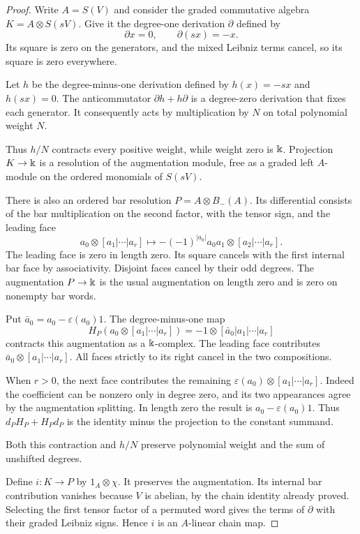 \begin{proof}
Write $A=S(V)$ and consider the graded commutative algebra
$K=A\otimes S(sV)$.
Give it the degree-one derivation $\partial$ defined by
\[
 \partial x=0,\qquad \partial(sx)=-x.
\]
Its square is zero on the generators, and the mixed Leibniz
terms cancel, so its square is zero everywhere.

Let $h$ be the degree-minus-one derivation defined by
$h(x)=-sx$ and $h(sx)=0$.
The anticommutator $\partial h+h\partial$ is a degree-zero
derivation that fixes each generator.
It consequently acts by multiplication by $N$ on total
polynomial weight $N$.

Thus $h/N$ contracts every positive weight, while weight zero
is $\Bbbk$.  Projection $K\to \Bbbk$ is a resolution of the augmentation
module, free as a graded left $A$-module on the ordered
monomials of $S(sV)$.

There is also an ordered bar resolution
$P=A\otimes B_-(A)$.
Its differential consists of the bar multiplication on the
second factor, with the tensor sign, and the leading face
\[
 a_0\otimes[a_1|\cdots|a_r]
 \longmapsto-(-1)^{|a_0|}a_0a_1\otimes[a_2|\cdots|a_r].
\]
The leading face is zero in length zero.
Its square cancels with the first internal bar face by
associativity.  Disjoint faces cancel by their odd degrees.
The augmentation $P\to \Bbbk$ is the usual augmentation on
length zero and is zero on nonempty bar words.

Put $\bar a_0=a_0-\varepsilon(a_0)1$.
The degree-minus-one map
\[
 H_P(a_0\otimes[a_1|\cdots|a_r])
 =-1\otimes[\bar a_0|a_1|\cdots|a_r]
\]
contracts this augmentation as a $\Bbbk$-complex.
The leading face contributes $\bar a_0\otimes[a_1|\cdots|a_r]$.
All faces strictly to its right cancel in the two compositions.

When $r>0$, the next face contributes the remaining
$\varepsilon(a_0)\otimes[a_1|\cdots|a_r]$.
Indeed the coefficient can be nonzero only in degree zero,
and its two appearances agree by the augmentation splitting.
In length zero the result is $a_0-\varepsilon(a_0)1$.
Thus $d_PH_P+H_Pd_P$ is the identity minus the projection to
the constant summand.

Both this contraction and $h/N$ preserve polynomial weight
and the sum of unshifted degrees.

Define $i:K\to P$ by $1_A\otimes\chi$.
It preserves the augmentation.  Its internal bar contribution
vanishes because $V$ is abelian, by the chain identity already
proved.  Selecting the first tensor factor of a permuted word gives
the terms of $\partial$ with their graded Leibniz signs.
Hence $i$ is an $A$-linear chain map.


\end{proof}

